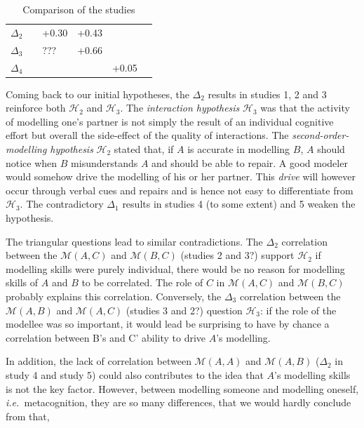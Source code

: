 \documentclass[twocolumn]{article}
\newcommand{\ie}{{\textit{i.e.\ }}}
\newcommand{\gmodel}[2]{{$\mathcal{M}(#1, #2)$}}
\begin{document}
\begin{table}[h!t]
{\begin{tabular}{p{3cm}|p{4cm}|p{4cm}|p{4cm}|p{4cm}|p{4cm}}
\textit{$\Delta_2$}                   &                                  & +0.30                           & +0.43                     &                           &                              \\
\textit{$\Delta_3$}                   &                                  & ???                             & +0.66                     &                           &                              \\
\textit{$\Delta_4$}                   &                                  &                                 &                           & +0.05                     &                             
\end{tabular}
}
\caption{Comparison of the studies}
\label{synthesis_table}
\end{table}

Coming back to our initial hypotheses, the $\Delta_2$ results in studies 1, 2
and 3 reinforce both $\mathcal{H}_{2}$ and $\mathcal{H}_{3}$. The
\emph{interaction hypothesis} $\mathcal{H}_{3}$ was that the activity of
modelling one's partner is not simply the result of an individual cognitive
effort but overall the side-effect of the quality of interactions. The
\emph{second-order-modelling hypothesis} $\mathcal{H}_{2}$ stated that, if $A$ is
accurate in modelling $B$, $A$ should notice when $B$ misunderstands $A$ and should be
able to repair. A good modeler would somehow drive the modelling of his or her
partner.  This \emph{drive} will however occur through verbal cues and repairs
and is hence not easy to differentiate from $\mathcal{H}_{3}$.  The
contradictory $\Delta_1$ results in studies 4 (to some extent) and 5 weaken the
hypothesis. 

The triangular questions lead to similar contradictions. The $\Delta_2$
correlation between the \gmodel{A}{C} and \gmodel{B}{C} (studies 2 and 3?)
support $\mathcal{H}_{2}$ if modelling skills were purely individual, there would
be no reason for modelling skills of $A$ and $B$ to be correlated.  The role of $C$ in
\gmodel{A}{C} and \gmodel{B}{C} probably explains this correlation.  Conversely,
the $\Delta_3$ correlation between the \gmodel{A}{B} and \gmodel{A}{C} (studies
3 and 2?) question $\mathcal{H}_{3}$: if the role of the modellee was so
important, it would lead be surprising to have by chance a correlation between
B's and C' ability to drive $A$'s modelling.

In addition, the lack of correlation between \gmodel{A}{A} and \gmodel{A}{B}
($\Delta_2$ in study 4 and study 5) could also contributes to the idea that $A$'s
modelling skills is not the key factor. However, between modelling someone and
modelling oneself, \ie  metacognition, they are so many differences, that we
would hardly conclude from that,
\end{document}
